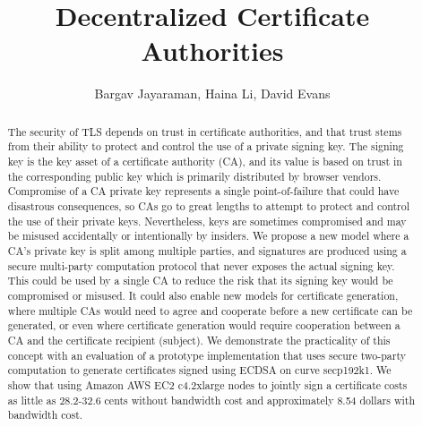 \documentclass[sigconf]{acmart}
\begin{document}
\title{Decentralized Certificate Authorities}


\author{Bargav Jayaraman, Haina Li, David Evans}

\begin{abstract}
\label{sec:abstract}
The security of TLS depends on trust in certificate authorities, and
that trust stems from their ability to protect and control the use of
a private signing key.  The signing key is the key asset of a
certificate authority (CA), and its value is based on trust in the
corresponding public key which is primarily distributed by browser
vendors.  Compromise of a CA private key represents a single
point-of-failure that could have disastrous consequences, so CAs go to
great lengths to attempt to protect and control the use of their
private keys. Nevertheless, keys are sometimes compromised and may be
misused accidentally or intentionally by insiders. We propose a new model where a CA's private key is split among
multiple parties, and signatures are produced using a secure
multi-party computation protocol that never exposes the actual signing
key. This could be used by a single CA to reduce the risk that its
signing key would be compromised or misused. It could also enable new
models for certificate generation, where multiple CAs would need to
agree and cooperate before a new certificate can be generated, or even
where certificate generation would require cooperation between a CA
and the certificate recipient (subject). We demonstrate the
practicality of this concept with an evaluation of a prototype
implementation that uses secure two-party computation to generate
certificates signed using ECDSA on curve secp192k1. We show that using
Amazon AWS EC2 c4.2xlarge nodes to jointly sign a certificate costs as
little as 28.2-32.6 cents without bandwidth cost and approximately
8.54 dollars with bandwidth cost.
 
   
\end{abstract}

%
%
\end{document}
